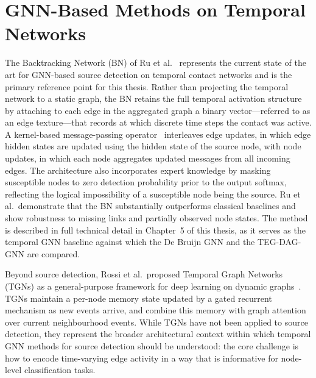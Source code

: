 \section{GNN-Based Methods on Temporal Networks}
\label{sec:rw-gnn-temporal}

The Backtracking Network (BN) of Ru et al.~\cite{Ru2023} represents the current state of the art for GNN-based source detection on temporal contact networks and is the primary reference point for this thesis. Rather than projecting the temporal network to a static graph, the BN retains the full temporal activation structure by attaching to each edge in the aggregated graph a binary vector---referred to as an edge texture---that records at which discrete time steps the contact was active. A kernel-based message-passing operator~\cite{Gilmer2017,Simonovsky2017} interleaves edge updates, in which edge hidden states are updated using the hidden state of the source node, with node updates, in which each node aggregates updated messages from all incoming edges. The architecture also incorporates expert knowledge by masking susceptible nodes to zero detection probability prior to the output softmax, reflecting the logical impossibility of a susceptible node being the source. Ru et al.\ demonstrate that the BN substantially outperforms classical baselines and show robustness to missing links and partially observed node states. The method is described in full technical detail in Chapter~5 of this thesis, as it serves as the temporal GNN baseline against which the De Bruijn GNN and the TEG-DAG-GNN are compared.

Beyond source detection, Rossi et al.\ proposed Temporal Graph Networks (TGNs) as a general-purpose framework for deep learning on dynamic graphs~\cite{Rossi2020}. TGNs maintain a per-node memory state updated by a gated recurrent mechanism as new events arrive, and combine this memory with graph attention over current neighbourhood events. While TGNs have not been applied to source detection, they represent the broader architectural context within which temporal GNN methods for source detection should be understood: the core challenge is how to encode time-varying edge activity in a way that is informative for node-level classification tasks.

